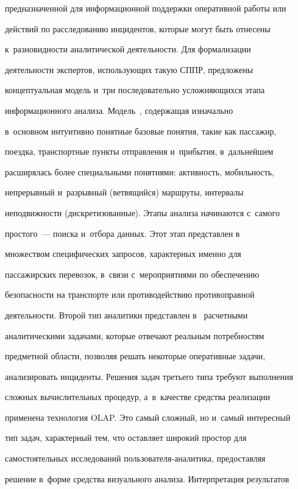 предназначенной для информационной поддержки оперативной работы или 


действий по расследованию инцидентов, которые могут быть отнесены 


к~разновидности аналитической деятельности. Для формализации 


деятельности экспертов, использующих такую СППР, предложены 


концептуальная модель и~три последовательно усложняющихся этапа 


информационного анализа. Модель~\cite{1-bi}, содержащая изначально 


в~основном интуитивно понятные базовые понятия, такие как пассажир, 


поездка, транспортные пункты отправления и~прибытия, в~дальнейшем 


расширялась более специальными понятиями: активность, мобильность, 


непрерывный и~разрывный (ветвящийся) маршруты, интервалы 


неподвижности (дискретизованные). Этапы анализа начинаются с~самого 


простого~--- поиска и~отбора данных. Этот этап представлен в~\cite{2-bi} 


множеством специфических запросов, характерных именно для 


пассажирских перевозок, в~связи с~мероприятиями по обеспечению 


безопасности на транспорте или противодействию противоправной 


деятельности. Второй тип аналитики представлен в~\cite{3-bi} расчетными 


аналитическими задачами, которые отвечают реальным потребностям 


предметной области, позволяя решать некоторые оперативные задачи, 


анализировать инциденты. Решения задач третьего типа требуют выполнения 


сложных вычислительных процедур, а~в~качестве средства реализации 


применена технология OLAP. Это самый сложный, но и~самый интересный 


тип задач, характерный тем, что оставляет широкий простор для 


самостоятельных исследований пользователя-аналитика, предоставляя 


решение в~форме средства визуального анализа. Интерпретация результатов 


